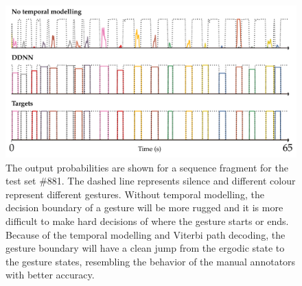 \begin{figure}[t]
  \centering
  \includegraphics[width=.7\textwidth]{images/output.pdf}
  \caption{The output probabilities are shown for a sequence fragment for the test set \#881. The dashed line represents silence and different colour represent different gestures. Without temporal modelling, the decision boundary of a gesture will be more rugged and it is more difficult to make hard decisions of where the gesture starts or ends. Because of the temporal modelling and Viterbi path decoding, the gesture boundary will have a clean jump from the ergodic state to the gesture states, resembling the behavior of the manual annotators with better accuracy.}
    \label{fig:temporalModellingComparision}
\end{figure}


